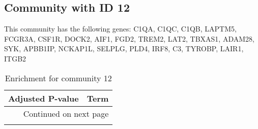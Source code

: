 \subsection*{Community with ID 12}
This community has the following genes: C1QA, C1QC, C1QB, LAPTM5, FCGR3A, CSF1R, DOCK2, AIF1, FGD2, TREM2, LAT2, TBXAS1, ADAM28, SYK, APBB1IP, NCKAP1L, SELPLG, PLD4, IRF8, C3, TYROBP, LAIR1, ITGB2
\\
\begin{longtable}{p{2.4cm}p{14.5cm}}
\caption{Enrichment for community 12}\\
\toprule
Adjusted \newline P-value &                                                                                                Term \\
\midrule
\endhead
\midrule
\multicolumn{2}{r}{{Continued on next page}} \\
\midrule
\endfoot


\end{longtable}
